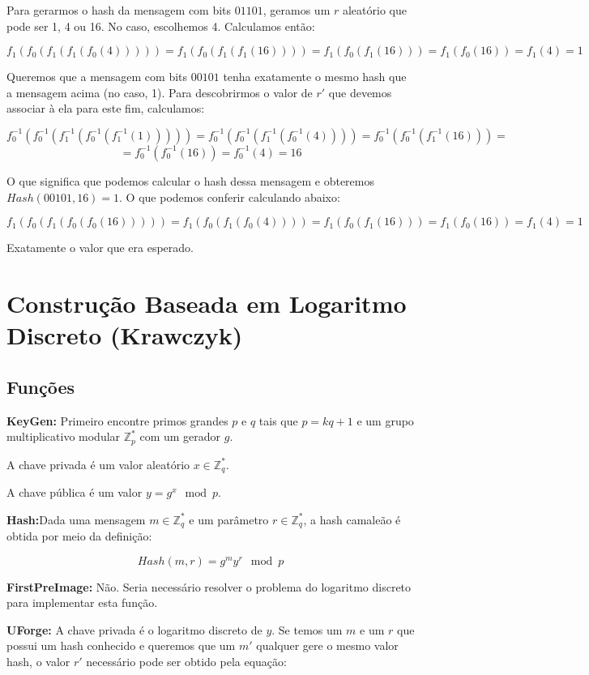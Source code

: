 \documentclass[a4paper]{article}
\begin{document}
Para gerarmos o hash da mensagem com bits $01101$, geramos um $r$
aleatório que pode ser 1, 4 ou 16. No caso, escolhemos 4. Calculamos
então:

$$
f_1(f_0(f_1(f_1(f_0(4))))) = f_1(f_0(f_1(f_1(16)))) = f_1(f_0(f_1(16))) =
f_1(f_0(16)) = f_1(4) = 1
$$

Queremos que a mensagem com bits $00101$ tenha exatamente o mesmo hash
que a mensagem acima (no caso, 1). Para descobrirmos o valor de $r'$
que devemos associar à ela para este fim, calculamos:

$$
f_0^{-1}(f_0^{-1}(f_1^{-1}(f_0^{-1}(f_1^{-1}(1))))) =
f_0^{-1}(f_0^{-1}(f_1^{-1}(f_0^{-1}(4)))) =
f_0^{-1}(f_0^{-1}(f_1^{-1}(16))) =
$$
$$
=f_0^{-1}(f_0^{-1}(16)) = f_0^{-1}(4) = 16
$$

O que significa que podemos calcular o hash dessa mensagem e obteremos
$Hash(00101, 16)=1$. O que podemos conferir calculando abaixo:

$$
f_1(f_0(f_1(f_0(f_0(16))))) = f_1(f_0(f_1(f_0(4)))) = f_1(f_0(f_1(16))) =
f_1(f_0(16)) = f_1(4) = 1
$$

Exatamente o valor que era esperado.

\section{Construção Baseada em Logaritmo Discreto (Krawczyk)
  \cite{krawczyk}}

\subsection{Funções}

\textbf{KeyGen: }Primeiro encontre primos grandes $p$ e $q$ tais que
$p = kq+1$ e um grupo multiplicativo modular $\mathbb{Z}^{*}_p$ com um
gerador $g$.

A chave privada é um valor aleatório $x \in \mathbb{Z}^{*}_q$.

A chave pública é um valor $y = g^x \mod p$.

\textbf{Hash:}Dada uma mensagem $m \in \mathbb{Z}^{*}_q$ e um
parâmetro $r\in \mathbb{Z}^{*}_q$, a hash camaleão é obtida por meio
da definição:

$$
Hash(m, r) = g^my^r \mod p
$$

\textbf{FirstPreImage:} Não. Seria necessário resolver o problema do
logaritmo discreto para implementar esta função.

\textbf{UForge:} A chave privada é o logaritmo discreto de $y$. Se
temos um $m$ e um $r$ que possui um hash conhecido e queremos que um
$m'$ qualquer gere o mesmo valor hash, o valor $r'$ necessário pode
ser obtido pela equação:
\end{document}
